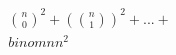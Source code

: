 \documentclass[preview]{standalone}
\begin{document}
\begin{align*}
\binom{n}{0}^2 + (\binom{n}{1})^2 + ... + \\binom{n}{n}^2
\end{align*}
\end{document}
